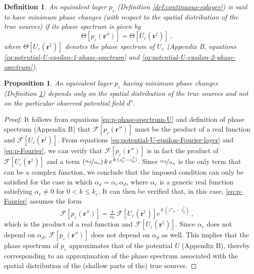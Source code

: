 \documentclass[manuscript,noblind]{geophysics}
\newtheorem{proposition}{Proposition}
\newtheorem{definition}{Definition}
\begin{document}
	\begin{definition}
		An equivalent layer $p_{\varepsilon}$ (Definition \ref{def:continuous-eqlayer}) is said to have minimum 
		phase changes (with respect to the spatial distribution of the true sources) if its phase spectrum is given by
		\begin{equation}
			\Theta [ p_{\varepsilon}(\mathbf{r}'') ] = \Theta [ U_{\varepsilon}(\mathbf{r}^{\dagger}) ] \: ,
			\label{eq:p-phase-spectrum-U}
		\end{equation}
		where $\Theta [ U_{\varepsilon}(\mathbf{r}^{\dagger}) ]$ denotes the phase spectrum of $U_{\varepsilon}$ 
		(Appendix B, equations \ref{eq:potential-U-epsilon-1-phase-spectrum} and \ref{eq:potential-U-epsilon-2-phase-spectrum}).
		\label{def:eql-min-phase}
	\end{definition}
	\begin{proposition}
		\label{prop:minimum-phase-change-layers}
		An equivalent layer $p_{\varepsilon}$ having minimum phase changes (Definition \ref{def:eql-min-phase})
		depends only on the spatial distribution of the true sources and not on the particular observed 
		potential field $d^{o}$.
	\end{proposition}
	\begin{proof}
		It follows from equations \ref{eq:p-phase-spectrum-U} and definition of phase spectrum (Appendix B) that 
		$\mathcal{F} [ p_{\varepsilon}(\mathbf{r}'') ]$ must be the product of a real function and
		$\mathcal{F} [ U_{\varepsilon}(\mathbf{r}^{\dagger}) ]$.
		From equations \ref{eq:potential-U-epsilon-Fourier-layer} and \ref{eq:p-Fourier}, we can verify that 
		$\mathcal{F} [ p_{\varepsilon}(\mathbf{r}'') ]$ is in fact the product of 
		$\mathcal{F} [ U_{\varepsilon}(\mathbf{r}^{\dagger}) ]$ 
		and a term $\left( \nicefrac{\alpha_{d}}{\alpha_{a}} \right) k \, e^{\, k \, (z''_{0} - z^{\dagger}_{0})}$. 
		Since $\nicefrac{\alpha_{d}}{\alpha_{a}}$ is the only term that can be a complex function, we conclude that 
		the imposed condition can only be satisfied for the case in which $\alpha_{a} = \alpha_{r} \, \alpha_{d}$, 
		where $\alpha_{r}$ is a generic real function satisfying $\alpha_{r} \ne 0$ for $0 < k \le k_{\varepsilon}$.
		It can then be verified that, in this case, \ref{eq:p-Fourier} assumes the form
		\begin{equation}
			\mathcal{F} [ p_{\varepsilon}(\mathbf{r}'') ] =
			\tfrac{k}{\alpha_{r}} \, \mathcal{F} [ U_{\varepsilon}(\mathbf{r}^{\dagger}) ] 
			e^{\, k \, (z''_{0} - z^{\dagger}_{0})} \: ,
			\label{eq:p-Fourier-min-phase}
		\end{equation}
		which is the product of a real function and $\mathcal{F} [ U_{\varepsilon}(\mathbf{r}^{\dagger}) ]$.
		Since $\alpha_{r}$ does not depend on $\alpha_{d}$, $\mathcal{F} [ p_{\varepsilon}(\mathbf{r}'') ]$ does not 
		depend on $\alpha_{d}$ as well. This implies that the phase spectrum of $p_{\varepsilon}$ approximates that 
		of the potential $U$ (Appendix B), thereby corresponding to an approximation 
		of the phase spectrum associated with the spatial distribution of the (shallow parts of the) true sources.
	\end{proof}
	
\end{document}

